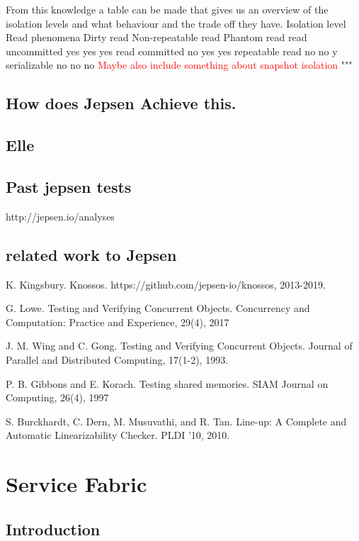 \documentclass[
  a4paper,  %
  twoside,  %
  bibliography=totoc,
  headsepline,
  cleardoublepage=empty,
  parskip=half,
  draft=false
]{scrbook}
\begin{document}
From this knowledge a table can be made that gives us an overview of the isolation levels and what behaviour and the trade off they have.
Isolation level	Read phenomena
Dirty read	Non-repeatable read	Phantom read
read uncommitted	yes	yes	yes
read committed	no	yes	yes
repeatable read	no	no	y
serializable	no	no	no
\textcolor{red}{Maybe also include something about snapshot isolation} 
"""



\subsection{How does Jepsen Achieve this.}



\subsection{Elle}


\subsection{Past jepsen tests}

http://jepsen.io/analyses


\subsection{related work to Jepsen}


K. Kingsbury. Knossos.
https://github.com/jepsen-io/knossos, 2013-2019.

G. Lowe. Testing and Verifying Concurrent Objects.
Concurrency and Computation: Practice and
Experience, 29(4), 2017

J. M. Wing and C. Gong. Testing and Verifying
Concurrent Objects. Journal of Parallel and
Distributed Computing, 17(1-2), 1993.

P. B. Gibbons and E. Korach. Testing shared
memories. SIAM Journal on Computing, 26(4), 1997

S. Burckhardt, C. Dern, M. Musuvathi, and R. Tan.
Line-up: A Complete and Automatic Linearizability
Checker. PLDI ’10, 2010.


\section{Service Fabric}

\subsection{Introduction}
\end{document}
